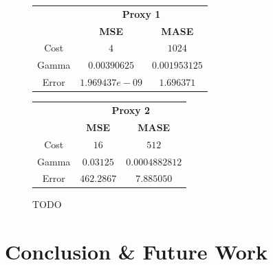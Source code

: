 \documentclass[11pt,a4paper,oneside]{book}
\begin{document}
\begin{figure}[!h]
\centering
\begin{minipage}{\textwidth}
\begin{minipage}{0.5\textwidth}
\begin{center}
\vskip10pt
   \begin{footnotesize}
   \begin{tabular}{|c|c|c|}
   \hline
   & \multicolumn{2}{|c|}{\textbf{Proxy 1}} \\ \cline{2-3}
   & \textbf{MSE} & \textbf{MASE}          \\ \hline
   Cost  & $4$            & $1024$          \\ 
   Gamma & $0.00390625$ & $0.001953125$ \\ 
   Error & $1.969437e-09$ & $1.696371$     \\ 
   \hline
   \end{tabular}
   \end{footnotesize}
\end{center}
\end{minipage}
\begin{minipage}{0.5\textwidth}
\begin{center}
\vskip12pt
   \begin{footnotesize}
   \begin{tabular}{|c|c|c|}
   \hline
   & \multicolumn{2}{|c|}{\textbf{Proxy 2}} \\ \cline{2-3}
   & \textbf{MSE} & \textbf{MASE}          \\ \hline
   Cost  & $16$      & $512$          \\ 
   Gamma & $0.03125$ & $0.0004882812$ \\ 
   Error & $462.2867$      & $7.885050$     \\ 
   \hline
   \end{tabular}
   \end{footnotesize}
\end{center}
\end{minipage}
\end{minipage}
\caption{TODO}
\label{fig:table10y}
\end{figure}








\chapter{Conclusion \& Future Work }
\end{document}
